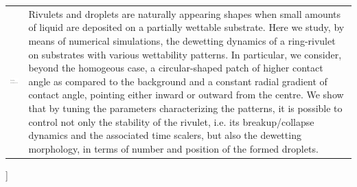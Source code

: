\documentclass[twoside,twocolumn,9pt]{article}
\begin{document}
\begin{@twocolumnfalse}
\begin{tabular}{m{4.5cm} p{13.5cm} }
\includegraphics{head_foot/dates} & \noindent\normalsize{
\noindent Rivulets and droplets are naturally appearing shapes when small amounts of liquid are deposited on a partially wettable substrate.
Here we study, by means of numerical simulations, the dewetting dynamics of a ring-rivulet on substrates with various wettability patterns.
In particular, we consider, beyond the homogeous case, a circular-shaped patch of higher contact angle as compared to the background and a constant radial gradient of contact angle, pointing either inward or outward from the centre. We show that 
by tuning the parameters characterizing the patterns, it is possible to control 
not only the stability of the rivulet, i.e. its breakup/collapse dynamics and 
the associated time scalers, but also the dewetting morphology, in terms of number and position of the formed droplets.
}

\end{tabular}

 \end{@twocolumnfalse} \vspace{0.6cm}

]

\renewcommand*\rmdefault{bch}\normalfont\upshape
\rmfamily
\section*{}
\vspace{-1cm}



\end{document}
